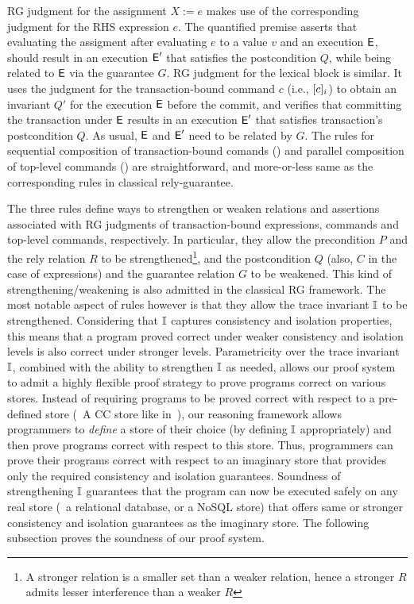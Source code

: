 RG judgment for the assignment $X:=e$ makes use of the corresponding
judgment for the RHS expression $e$. The quantified premise asserts
that evaluating the assigment after evaluating $e$ to a value $v$ and
an execution $\textsf{E}$, should result in an execution $\textsf{E}'$ that satisfies
the postcondition $Q$, while being related to $\textsf{E}$ via the guarantee
$G$. RG judgment for the  lexical block is similar.  It uses
the judgment for the transaction-bound command $c$ (i.e.,
$\lbrack c \rbrack_i$) to obtain an invariant $Q'$ for the execution $\textsf{E}$
before the commit, and verifies that committing the transaction under
$\textsf{E}$ results in an execution $\textsf{E}'$ that satisfies transaction's
postcondition $Q$. As usual, $\textsf{E}$ and $\textsf{E}'$ need to be related by $G$.
The rules for sequential composition of transaction-bound comands
() and parallel composition of top-level commands
() are straightforward, and more-or-less same as the
corresponding rules in classical rely-guarantee.

The three  rules define ways to strengthen or
weaken relations and assertions associated with RG judgments of
transaction-bound expressions, commands and top-level commands,
respectively. In particular, they allow the precondition $P$ and the
rely relation $R$ to be strengthened\footnote{A stronger relation is a
smaller set than a weaker relation, hence a stronger $R$ admits lesser
interference than a weaker $R$}, and the postcondition $Q$ (also, $C$
in the case of expressions) and the guarantee relation $G$ to be
weakened. This kind of strengthening/weakening is also admitted in the
classical RG framework. The most notable aspect of
 rules however is that they allow the trace
invariant $\mathbb{I}$ to be strengthened. Considering that $\mathbb{I}$ captures
consistency and isolation properties, this means that a program proved
correct under weaker consistency and isolation levels is also correct
under stronger levels.  Parametricity over the trace invariant $\mathbb{I}$,
combined with the ability to strengthen $\mathbb{I}$ as needed, allows our
proof system to admit a highly flexible proof strategy to prove
programs correct on various stores. Instead of requiring programs to
be proved correct with respect to a pre-defined store (\eg~A CC store
like in~\cite{gotsmanpopl16}), our reasoning framework allows
programmers to \emph{define} a store of their choice (by defining $\mathbb{I}$
appropriately) and then prove programs correct with respect to this
store. Thus, programmers can prove their programs correct with respect
to an imaginary store that provides only the required consistency and
isolation guarantees. Soundness of strengthening $\mathbb{I}$ guarantees that
the program can now be executed safely on any real store (\eg~a
relational database, or a NoSQL store) that offers same or stronger
consistency and isolation guarantees as the imaginary store. The
following subsection proves the soundness of our proof system.

